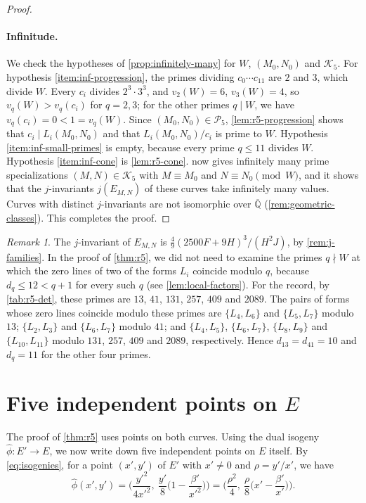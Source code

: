 \documentclass[12pt,oneside,openany]{book}
\theoremstyle{definition}
\theoremstyle{plain}
\numberwithin{equation}{chapter}
\theoremstyle{plain}
\theoremstyle{definition}
\theoremstyle{remark}
\newtheorem{remark}[remark]{Remark}
\newcommand{\Qbar}{\overline{\mathbb Q}}
\newcommand{\dual}{\hat\phi}
\newcommand{\cP}{\mathcal P}
\newcommand{\cK}{\mathcal K}
\begin{document}
\begin{proof}
\paragraph{Infinitude.} We check the hypotheses of \cref{prop:infinitely-many} for $W$, $(M_0,N_0)$ and $\cK_5$. For hypothesis \ref{item:inf-progression}, the primes dividing $c_0\cdots c_{11}$ are $2$ and $3$, which divide $W$. Every $c_i$ divides $2^3\cdot3^3$, and $v_2(W)=6$, $v_3(W)=4$, so $v_q(W)>v_q(c_i)$ for $q=2,3$; for the other primes $q\mid W$, we have $v_q(c_i)=0<1=v_q(W)$. Since $(M_0,N_0)\in\cP_5$, \cref{lem:r5-progression} shows that $c_i\mid L_i(M_0,N_0)$ and that $L_i(M_0,N_0)/c_i$ is prime to $W$. Hypothesis \ref{item:inf-small-primes} is empty, because every prime $q\le11$ divides $W$. Hypothesis \ref{item:inf-cone} is \cref{lem:r5-cone}.  now gives infinitely many prime specializations $(M,N)\in\cK_5$ with $M\equiv M_0$ and $N\equiv N_0\pmod W$, and it shows that the $j$-invariants $j(E_{M,N})$ of these curves take infinitely many values. Curves with distinct $j$-invariants are not isomorphic over $\Qbar$ (\cref{rem:geometric-classes}). This completes the proof.
\end{proof}

\begin{remark}\label{rem:r5-j}
The $j$-invariant of $E_{M,N}$ is $\tfrac49(2500F+9H)^3/(H^2J)$, by \cref{rem:j-families}. In the proof of \cref{thm:r5}, we did not need to examine the primes $q\nmid W$ at which the zero lines of two of the forms $L_i$ coincide modulo $q$, because $d_q\le12<q+1$ for every such $q$ (see \cref{lem:local-factors}). For the record, by \cref{tab:r5-det}, these primes are $13$, $41$, $131$, $257$, $409$ and $2089$. The pairs of forms whose zero lines coincide modulo these primes are $\{L_4,L_6\}$ and $\{L_5,L_7\}$ modulo $13$; $\{L_2,L_3\}$ and $\{L_6,L_7\}$ modulo $41$; and $\{L_4,L_5\}$, $\{L_6,L_7\}$, $\{L_8,L_9\}$ and $\{L_{10},L_{11}\}$ modulo $131$, $257$, $409$ and $2089$, respectively. Hence $d_{13}=d_{41}=10$ and $d_q=11$ for the other four primes.
\end{remark}

\section{Five independent points on \texorpdfstring{$E$}{E}}\label{sec:r5-five-points}

The proof of \cref{thm:r5} uses points on both curves. Using the dual isogeny $\dual\colon E'\to E$, we now write down five independent points on $E$ itself. By \eqref{eq:isogenies}, for a point $(x',y')$ of $E'$ with $x'\ne0$ and $\rho=y'/x'$, we have
\begin{equation}\label{r5:dual-formula}
\dual(x',y')=\Big(\frac{y'^2}{4x'^2},\ \frac{y'}8\Big(1-\frac{\beta'}{x'^2}\Big)\Big)=\Big(\frac{\rho^2}4,\ \frac\rho8\Big(x'-\frac{\beta'}{x'}\Big)\Big).
\end{equation}
\end{document}
